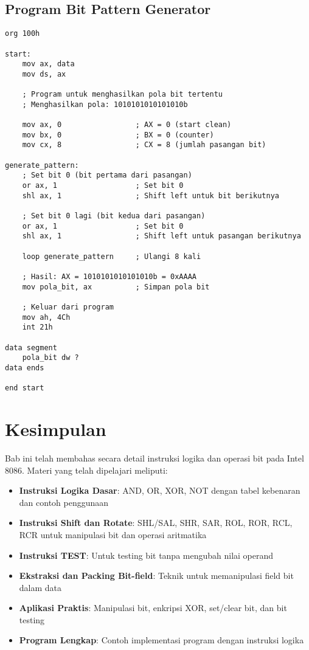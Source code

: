 \documentclass[../main.tex]{subfiles}
\begin{document}
\subsection{Program Bit Pattern Generator}
\begin{lstlisting}[language={[x86masm]Assembler}, caption=Program Generator Pola Bit, label={lst:bit-pattern-program}]
org 100h

start:
    mov ax, data
    mov ds, ax
    
    ; Program untuk menghasilkan pola bit tertentu
    ; Menghasilkan pola: 1010101010101010b
    
    mov ax, 0                 ; AX = 0 (start clean)
    mov bx, 0                 ; BX = 0 (counter)
    mov cx, 8                 ; CX = 8 (jumlah pasangan bit)
    
generate_pattern:
    ; Set bit 0 (bit pertama dari pasangan)
    or ax, 1                  ; Set bit 0
    shl ax, 1                 ; Shift left untuk bit berikutnya
    
    ; Set bit 0 lagi (bit kedua dari pasangan)
    or ax, 1                  ; Set bit 0
    shl ax, 1                 ; Shift left untuk pasangan berikutnya
    
    loop generate_pattern     ; Ulangi 8 kali
    
    ; Hasil: AX = 1010101010101010b = 0xAAAA
    mov pola_bit, ax          ; Simpan pola bit
    
    ; Keluar dari program
    mov ah, 4Ch
    int 21h

data segment
    pola_bit dw ?
data ends

end start
\end{lstlisting}

\section{Kesimpulan}
Bab ini telah membahas secara detail instruksi logika dan operasi bit pada Intel 8086. Materi yang telah dipelajari meliputi:

\begin{itemize}
    \item \textbf{Instruksi Logika Dasar}: AND, OR, XOR, NOT dengan tabel kebenaran dan contoh penggunaan
    \item \textbf{Instruksi Shift dan Rotate}: SHL/SAL, SHR, SAR, ROL, ROR, RCL, RCR untuk manipulasi bit dan operasi aritmatika
    \item \textbf{Instruksi TEST}: Untuk testing bit tanpa mengubah nilai operand
    \item \textbf{Ekstraksi dan Packing Bit-field}: Teknik untuk memanipulasi field bit dalam data
    \item \textbf{Aplikasi Praktis}: Manipulasi bit, enkripsi XOR, set/clear bit, dan bit testing
    \item \textbf{Program Lengkap}: Contoh implementasi program dengan instruksi logika
\end{itemize}
\end{document}
